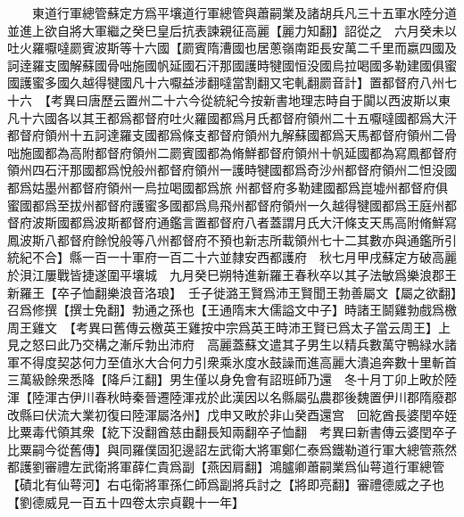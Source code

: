 　　東道行軍總管蘇定方爲平壤道行軍總管與蕭嗣業及諸胡兵凡三十五軍水陸分道並進上欲自將大軍繼之癸巳皇后抗表諫親征高麗【麗力知翻】詔從之　六月癸未以吐火羅嚈噠罽賓波斯等十六國【罽賓隋漕國也居蔥嶺南距長安萬二千里而嬴四國及訶逹羅支國解蘇國骨咄施國帆延國石汗那國護時犍國恒没國烏拉喝國多勒建國俱蜜國護蜜多國久越得犍國凡十六嚈益涉翻噠當割翻又宅軋翻罽音計】置都督府八州七十六　【考異曰唐歷云置州二十六今從統紀今按新書地理志時自于闐以西波斯以東凡十六國各以其王都爲都督府吐火羅國都爲月氏都督府領州二十五嚈噠國都爲大汗都督府領州十五訶達羅支國都爲條支都督府領州九解蘇國都爲天馬都督府領州二骨咄施國都為高附都督府領州二罽賓國都為脩鮮都督府領州十帆延國都為寫鳳都督府領州四石汗那國都爲悅般州都督府領州一護時犍國都爲奇沙州都督府領州二怛没國都爲姑墨州都督府領州一烏拉喝國都爲旅州都督府多勒建國都爲崑墟州都督府俱蜜國都爲至拔州都督府護蜜多國都爲鳥飛州都督府領州一久越得犍國都爲王庭州都督府波斯國都爲波斯都督府通鑑言置都督府八者蓋謂月氏大汗條支天馬高附脩鮮寫鳳波斯八都督府餘悅般等八州都督府不預也新志所載領州七十二其數亦與通鑑所引統紀不合】縣一百一十軍府一百二十六並隸安西都護府　秋七月甲戌蘇定方破高麗於浿江屢戰皆捷遂圍平壤城　九月癸巳朔特進新羅王春秋卒以其子法敏爲樂浪郡王新羅王【卒子恤翻樂浪音洛琅】　壬子徙潞王賢爲沛王賢聞王勃善屬文【屬之欲翻】召爲修撰【撰士免翻】勃通之孫也【王通隋末大儒謚文中子】時諸王鬬雞勃戲爲檄周王雞文　【考異曰舊傳云檄英王雞按中宗爲英王時沛王賢已爲太子當云周王】上見之怒曰此乃交構之漸斥勃出沛府　高麗蓋蘇文遣其子男生以精兵數萬守鴨緑水諸軍不得度契苾何力至值氷大合何力引衆乘氷度水鼓譟而進高麗大潰追奔數十里斬首三萬級餘衆悉降【降戶江翻】男生僅以身免會有詔班師乃還　冬十月丁卯上畋於陸渾【陸渾古伊川春秋時秦晉遷陸渾戎於此漢因以名縣屬弘農郡後魏置伊川郡隋廢郡改縣曰伏流大業初復曰陸渾屬洛州】戊申又畋於非山癸酉還宫　回紇酋長婆閏卒姪比粟毒代領其衆【紇下没翻酋慈由翻長知兩翻卒子恤翻　考異曰新書傳云婆閏卒子比粟嗣今從舊傳】與同羅僕固犯邊詔左武衛大將軍鄭仁泰爲鐵勒道行軍大總管燕然都護劉審禮左武衛將軍薛仁貴爲副【燕因肩翻】鴻臚卿蕭嗣業爲仙萼道行軍總管【磧北有仙萼河】右屯衛將軍孫仁師爲副將兵討之【將即亮翻】審禮德威之子也【劉德威見一百五十四卷太宗貞觀十一年】


